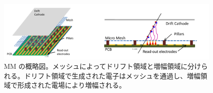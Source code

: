 \begin{figure}[tb]
  \centering
  \includegraphics[clip, width=13cm]{fig/2/mm-structure.pdf}
  \caption{MM の概略図。メッシュによってドリフト領域と増幅領域に分けられる。ドリフト領域で生成された電子はメッシュを通過し、増幅領域で形成された電場により増幅される。}
  \label{fig:MM}
\end{figure}








